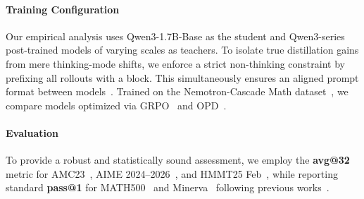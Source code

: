 \documentclass[11pt]{article}
\begin{document}
\paragraph{Training Configuration}

Our empirical analysis uses Qwen3-1.7B-Base as the student and Qwen3-series post-trained models of varying scales as teachers. To isolate true distillation gains from mere thinking-mode shifts, we enforce a strict non-thinking constraint by prefixing all rollouts with a \textit{} block. This simultaneously ensures an aligned prompt format between models~\cite{li2026rethinkingonpolicydistillationlarge}. Trained on the Nemotron-Cascade Math dataset~\citep{nemotron}, we compare models optimized via GRPO~\citep{grpo, dapo} and OPD~\citep{gu2026minillmonpolicydistillationlarge}.



\paragraph{Evaluation}
To provide a robust and statistically sound assessment, we employ the \textbf{avg@32} metric for AMC23~\cite{MAA_AMC}, AIME 2024--2026~\cite{MAA_AIME}, and HMMT25 Feb~\cite{hmmt}, while reporting standard \textbf{pass@1} for MATH500~\cite{hendrycks2021math} and Minerva~\cite{lewkowycz2022minerva} following previous works~\cite{eopd}. 
\end{document}
